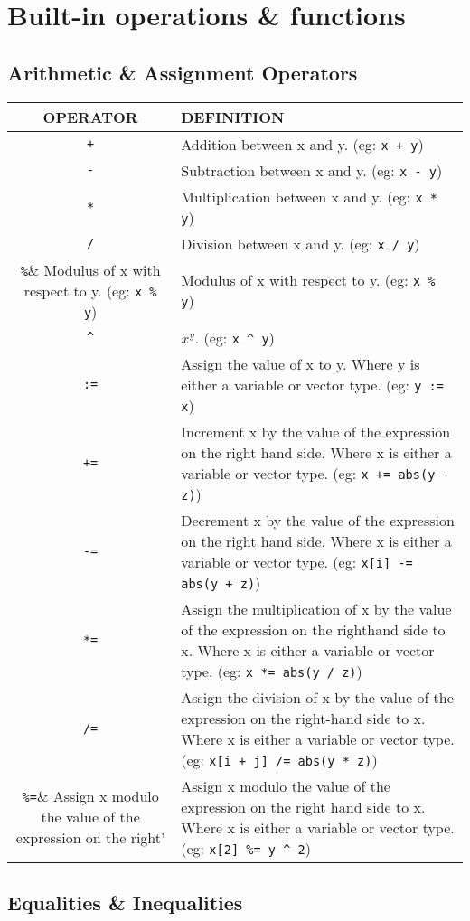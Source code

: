 \section{Built-in operations \& functions}

\subsection{Arithmetic \& Assignment Operators}

\begin{tabular}{|c|p{}|}
\hline
OPERATOR & DEFINITION \\
\hline
\verb'+' &  Addition between x and y.  (eg: \verb'x + y')\\
\verb'-'& Subtraction between x and y.  (eg: \verb'x - y')\\
\verb'*'&   Multiplication between x and y.  (eg: \verb'x * y')\\
\verb'/'& Division between x and y.  (eg: \verb'x / y')\\
\verb'%'& Modulus of x with respect to y.  (eg: \verb'x % y')\\
\verb'^'& $x^y$.  (eg: \verb'x ^ y')\\
\verb':='& Assign the value of x to y. Where y is either a variable
 or vector type.  (eg: \verb'y := x')\\
\verb'+='&Increment x by the value of the expression on the right 
hand side. Where x is either a variable or vector type. 
(eg: \verb'x += abs(y - z)')\\
\verb'-='&  Decrement x by the value of the expression on the right 
hand side. Where x is either a variable or vector type. 
(eg: \verb'x[i] -= abs(y + z)')\\
\verb'*='& Assign the multiplication of x by the value of the 
 expression on the righthand side to x. Where x is either
 a variable or vector type. (eg: \verb'x *= abs(y / z)')\\
\verb'/='& Assign the division of x by the value of the expression
on the right-hand side to x. Where x is either a  variable or vector
type.  (eg: \verb'x[i + j] /= abs(y * z)')\\
\verb'%='& Assign x modulo the value of the expression on the right
hand side to x. Where x is either a variable or vector type.  (eg:
\verb'x[2] %= y ^ 2')\\
\hline
\end{tabular}

\subsection{Equalities \& Inequalities}

